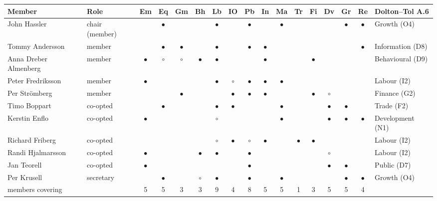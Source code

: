 \begin{tabular}{@{}llccccccccccccccl@{}}
\toprule
Member & Role & Em & Eq & Gm & Bh & Lb & IO & Pb & In & Ma & Tr & Fi & Dv & Gr & Re & Dolton--Tol A.6 \\
\midrule
John Hassler & chair (member) &  & $\bullet$ &  &  & $\bullet$ &  & $\bullet$ &  & $\bullet$ &  &  &  & $\bullet$ & $\bullet$ & Growth (O4) \\
Tommy Andersson & member &  & $\bullet$ & $\bullet$ &  & $\bullet$ &  & $\bullet$ & $\bullet$ &  &  &  &  &  & $\bullet$ & Information (D8) \\
Anna Dreber Almenberg & member & $\bullet$ & $\circ$ & $\circ$ & $\bullet$ & $\bullet$ &  &  & $\bullet$ &  &  & $\bullet$ &  &  &  & Behavioural (D9) \\
Peter Fredriksson & member & $\bullet$ &  &  &  & $\bullet$ & $\circ$ & $\bullet$ & $\bullet$ & $\bullet$ &  &  &  &  &  & Labour (I2) \\
Per Strömberg & member &  &  & $\bullet$ &  &  & $\bullet$ & $\bullet$ & $\bullet$ &  &  & $\bullet$ & $\circ$ &  &  & Finance (G2) \\
Timo Boppart & co-opted &  & $\bullet$ &  &  & $\bullet$ & $\bullet$ &  &  & $\bullet$ &  &  & $\bullet$ & $\bullet$ &  & Trade (F2) \\
Kerstin Enflo & co-opted & $\bullet$ &  &  &  & $\circ$ &  &  &  & $\bullet$ &  &  & $\bullet$ & $\bullet$ & $\bullet$ & Development (N1) \\
Richard Friberg & co-opted &  &  &  &  & $\circ$ & $\bullet$ & $\circ$ & $\bullet$ &  & $\bullet$ & $\bullet$ &  &  &  & Labour (I2) \\
Randi Hjalmarsson & co-opted & $\bullet$ &  &  & $\bullet$ & $\bullet$ &  & $\bullet$ &  &  &  &  & $\circ$ &  &  & Labour (I2) \\
Jan Teorell & co-opted & $\bullet$ &  &  &  &  &  & $\bullet$ &  &  &  &  & $\bullet$ & $\bullet$ &  & Public (D7) \\
Per Krusell & secretary &  & $\bullet$ &  & $\circ$ & $\bullet$ &  & $\bullet$ &  & $\bullet$ &  &  &  & $\bullet$ & $\bullet$ & Growth (O4) \\
\midrule
members covering & & 5 & 5 & 3 & 3 & 9 & 4 & 8 & 5 & 5 & 1 & 3 & 5 & 5 & 4 & \\
\bottomrule
\end{tabular}
